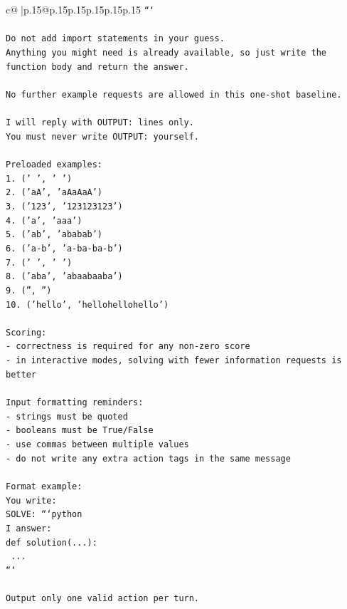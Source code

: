 \documentclass{article}
\begin{document}
{\begin{supertabular}{c@{$\;$}|p{.15\linewidth}@{}p{.15\linewidth}p{.15\linewidth}p{.15\linewidth}p{.15\linewidth}p{.15\linewidth}}
{{{\texttt{```} \\
\\ 
\texttt{Do not add import statements in your guess.} \\
\texttt{Anything you might need is already available, so just write the function body and return the answer.} \\
\\ 
\texttt{No further example requests are allowed in this one{-}shot baseline.} \\
\\ 
\texttt{I will reply with OUTPUT: lines only.} \\
\texttt{You must never write OUTPUT: yourself.} \\
\\ 
\texttt{Preloaded examples:} \\
\texttt{1. ('   ', '         ')} \\
\texttt{2. ('aA', 'aAaAaA')} \\
\texttt{3. ('123', '123123123')} \\
\texttt{4. ('a', 'aaa')} \\
\texttt{5. ('ab', 'ababab')} \\
\texttt{6. ('a{-}b', 'a{-}ba{-}ba{-}b')} \\
\texttt{7. (' ', '   ')} \\
\texttt{8. ('aba', 'abaabaaba')} \\
\texttt{9. ('', '')} \\
\texttt{10. ('hello', 'hellohellohello')} \\
\\ 
\texttt{Scoring:} \\
\texttt{{-} correctness is required for any non{-}zero score} \\
\texttt{{-} in interactive modes, solving with fewer information requests is better} \\
\\ 
\texttt{Input formatting reminders:} \\
\texttt{{-} strings must be quoted} \\
\texttt{{-} booleans must be True/False} \\
\texttt{{-} use commas between multiple values} \\
\texttt{{-} do not write any extra action tags in the same message} \\
\\ 
\texttt{Format example:} \\
\texttt{You write:} \\
\texttt{SOLVE: ```python} \\
\texttt{I answer:} \\
\texttt{def solution(...):} \\
\texttt{    ...} \\
\texttt{```} \\
\\ 
\texttt{Output only one valid action per turn.} \\
            }
        }
    }
     \\ \\


\end{supertabular}}
\end{document}
